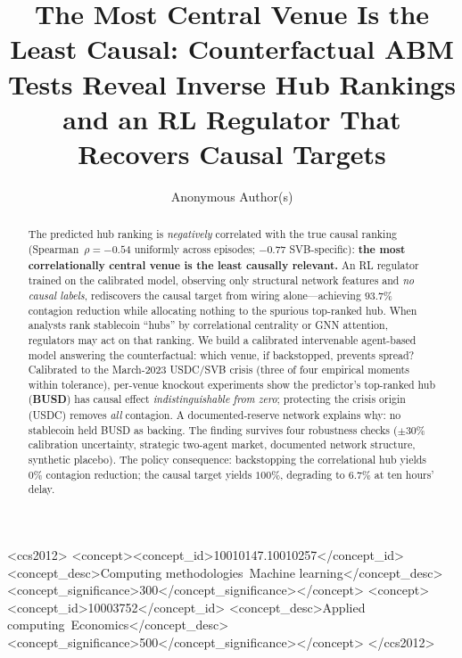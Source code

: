 \documentclass[sigconf,anonymous]{acmart}
\begin{document}

\title{The Most Central Venue Is the Least Causal: Counterfactual ABM Tests
Reveal Inverse Hub Rankings and an RL Regulator That Recovers Causal Targets}

\author{Anonymous Author(s)}

\begin{abstract}
The predicted hub ranking is \emph{negatively} correlated with the true causal ranking
(Spearman~$\rho{=}{-}0.54$ uniformly across episodes; $-0.77$ SVB-specific): \textbf{the most
correlationally central venue is the least causally relevant.}
An RL regulator trained on the calibrated model, observing only structural network features
and \emph{no causal labels}, rediscovers the causal target from wiring alone---achieving
$93.7\%$ contagion reduction while allocating nothing to the spurious top-ranked hub.
When analysts rank stablecoin ``hubs'' by correlational centrality or GNN attention,
regulators may act on that ranking. We build a calibrated intervenable agent-based model
answering the counterfactual: which venue, if backstopped, prevents spread?
Calibrated to the March-2023 USDC/SVB crisis (three of four empirical moments within
tolerance), per-venue knockout experiments show the predictor's top-ranked hub
(\textbf{BUSD}) has causal effect \emph{indistinguishable from zero}; protecting the
crisis origin (USDC) removes \emph{all} contagion. A documented-reserve network explains
why: no stablecoin held BUSD as backing. The finding survives four robustness checks
($\pm30\%$ calibration uncertainty, strategic two-agent market, documented network
structure, synthetic placebo). The policy consequence: backstopping the correlational
hub yields $0\%$ contagion reduction; the causal target yields $100\%$, degrading to
$6.7\%$ at ten hours' delay.
\end{abstract}


\begin{CCSXML}
<ccs2012>
<concept><concept_id>10010147.10010257</concept_id>
<concept_desc>Computing methodologies~Machine learning</concept_desc>
<concept_significance>300</concept_significance></concept>
<concept><concept_id>10003752</concept_id>
<concept_desc>Applied computing~Economics</concept_desc>
<concept_significance>500</concept_significance></concept>
</ccs2012>
\end{CCSXML}
\end{document}
